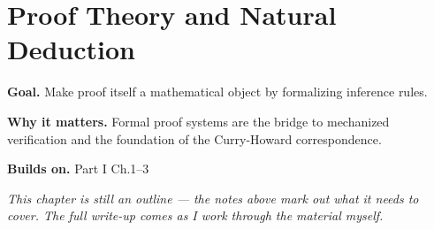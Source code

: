 \chapter{Proof Theory and Natural Deduction}
\label{ch:01-mathematical-logic-and-proof-theory-04}

\begin{chapterintro}
\textbf{Goal.} Make proof itself a mathematical object by formalizing inference rules.

\textbf{Why it matters.} Formal proof systems are the bridge to mechanized verification and the foundation of the Curry-Howard correspondence.

\textbf{Builds on.} Part I Ch.1–3
\end{chapterintro}

\textit{This chapter is still an outline --- the notes above mark out what it needs to cover. The full write-up comes as I work through the material myself.}
